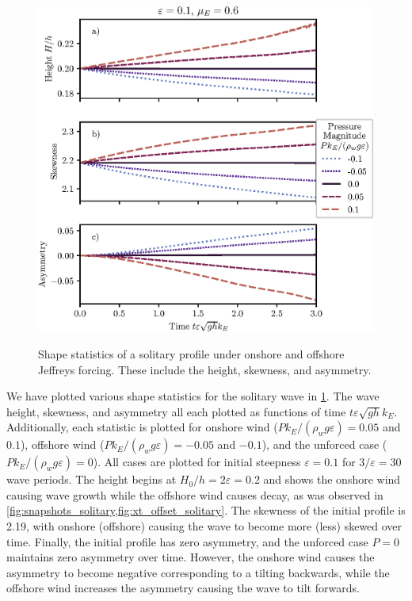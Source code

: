 \documentclass{jfm}
\renewcommand*{\epsilon}{\varepsilon}
\begin{document}
\begin{figure}
  \centering
  { %
    \label{fig:statistics_solitary:a}
    \label{fig:statistics_solitary:b}
    \label{fig:statistics_solitary:c}
  }
  \includegraphics{Skew-Asymm-No-Peak.eps}
  \caption{
    Shape statistics of a solitary profile under onshore and offshore
    Jeffreys forcing.
    These include the
    height,
    skewness, and
    asymmetry.
  }
  \label{fig:statistics_solitary}
\end{figure}

We have plotted various shape statistics for the solitary wave in
\cref{fig:statistics_solitary}.
The  wave height,
 skewness, and
 asymmetry all each plotted as
functions of time $t \epsilon \sqrt{g h} k_E$.
Additionally, each statistic is plotted for onshore wind ($P
k_E/(\rho_w g \epsilon) = 0.05$ and $0.1$), offshore wind ($P
k_E/(\rho_w g \epsilon) = -0.05$ and $-0.1$), and the unforced case
($P k_E/(\rho_w g \epsilon) = 0$).
All cases are plotted for initial steepness $\epsilon = 0.1$ for
$3/\epsilon = 30$ wave periods.
The height  begins at $H_0/h = 2
\epsilon = 0.2$ and shows the onshore wind
causing wave growth while the offshore wind causes decay, as was
observed in \cref{fig:snapshots_solitary,fig:xt_offset_solitary}.
The skewness of the initial profile is \num{2.19}, with onshore
(offshore) causing the wave to become more (less) skewed over time.
Finally, the initial profile has zero asymmetry, and the unforced case
$P=0$ maintains zero asymmetry over time.
However, the onshore wind causes the asymmetry to become negative
corresponding to a tilting backwards, while the offshore wind increases
the asymmetry causing the wave to tilt forwards.
\end{document}
